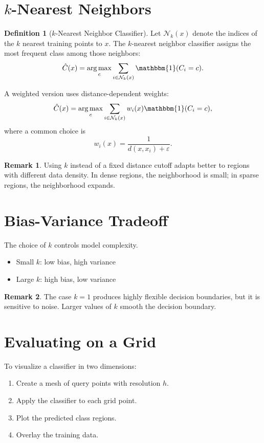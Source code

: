 \documentclass[12pt,oneside]{book}
\numberwithin{equation}{section}
\theoremstyle{definition}
\newtheorem{definition}{Definition}[section]
\newtheorem{remark}{Remark}[section]
\theoremstyle{plain}
\theoremstyle{remark}
\newcommand{\ind}{\mathbbm{1}}
\newcommand{\argmax}{\operatorname*{arg\,max}}
\begin{document}
\section{$k$-Nearest Neighbors}

\begin{definition}[$k$-Nearest Neighbor Classifier]
Let $\mathcal{N}_k(x)$ denote the indices of the $k$ nearest training points to $x$. The $k$-nearest neighbor classifier assigns the most frequent class among those neighbors:
\[
\hat{C}(x)
=
\argmax_{c}
\sum_{i\in \mathcal{N}_k(x)}
\ind(C_i=c).
\]
\end{definition}

A weighted version uses distance-dependent weights:
\[
\hat{C}(x)
=
\argmax_c
\sum_{i\in \mathcal{N}_k(x)}
w_i(x)\ind(C_i=c),
\]
where a common choice is
\[
w_i(x)=\frac{1}{d(x,x_i)+\varepsilon}.
\]

\begin{remark}
Using $k$ instead of a fixed distance cutoff adapts better to regions with different data density. In dense regions, the neighborhood is small; in sparse regions, the neighborhood expands.
\end{remark}

\section{Bias-Variance Tradeoff}

The choice of $k$ controls model complexity.

\begin{itemize}
    \item Small $k$: low bias, high variance
    \item Large $k$: high bias, low variance
\end{itemize}

\begin{remark}
The case $k=1$ produces highly flexible decision boundaries, but it is sensitive to noise. Larger values of $k$ smooth the decision boundary.
\end{remark}

\section{Evaluating on a Grid}

To visualize a classifier in two dimensions:
\begin{enumerate}
    \item Create a mesh of query points with resolution $h$.
    \item Apply the classifier to each grid point.
    \item Plot the predicted class regions.
    \item Overlay the training data.
\end{enumerate}
\end{document}
